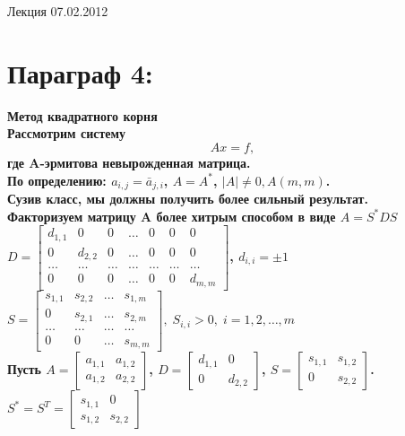 \documentclass[oneside, final, 14pt]{extreport}
\begin{document}
Лекция 07.02.2012
\section{Параграф 4:} 
\bfseries
Метод квадратного корня
\\
\normalfont
Рассмотрим систему \begin{equation}Ax=f,\end{equation} где A-эрмитова невырожденная матрица.
\\
По определению: \(a_{i,j}=\bar a_{j,i}\), \(A=A^{*}\), \(\mid A \mid \neq 0, A(m,m)\).
\\Сузив класс, мы должны получить более сильный результат.
\\Факторизуем матрицу A более хитрым способом в виде \(A=S^{*}DS\)
\\ 
\(D=\begin{bmatrix} d_{1,1} & 0 & 0 & \ldots & 0 & 0 & 0 \\ 0 & d_{2,2} & 0  & \ldots & 0 & 0 & 0 \\ \ldots & \ldots & \ldots & \ldots & \ldots & \ldots & \ldots \\ 0 & 0 & 0 & \ldots & 0 & 0 & d_{m,m} \end{bmatrix} \), \(d_{i,i}=\pm 1\)
\\
\(S=\begin{bmatrix} s_{1,1} & s_{2,2} & \ldots & s_{1,m} \\ 0 & s_{2,1} & \ldots & s_{2,m} \\ \ldots & \ldots & \ldots & \ldots \\ 0 & 0 & \ldots & s_{m,m} \end{bmatrix}, \; S_{i,i}>0, \; i=1,2, \ldots, m \)
\\
Пусть \( A=\begin{bmatrix} a_{1,1} & a_{1,2} \\ a_{1,2} & a_{2,2} \end{bmatrix}\),  
\(D=\begin{bmatrix} d_{1,1} & 0 \\ 0 & d_{2,2} \end{bmatrix}\), 
\(S= \begin{bmatrix} s_{1,1} & s_{1,2} \\ 0 & s_{2,2} \end{bmatrix}\).  
\\
\(S^{*}=S^{T}=\begin{bmatrix} s_{1,1} & 0 \\ s_{1,2} & s_{2,2} \end{bmatrix} \)
\end{document}
